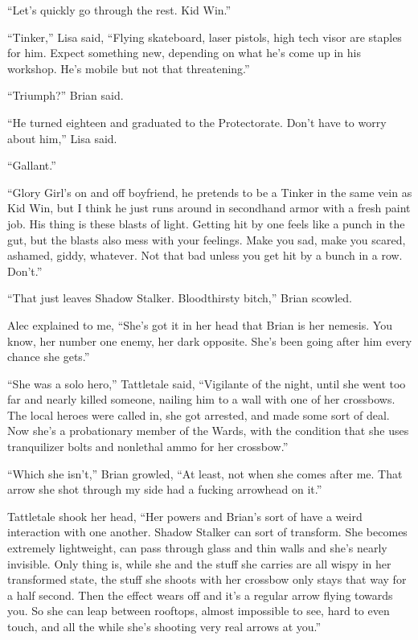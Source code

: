 ``Let's quickly go through the rest.  Kid Win.''



``Tinker,'' Lisa said, ``Flying skateboard, laser pistols, high tech visor are staples for him.  Expect something new, depending on what he's come up in his workshop.  He's mobile but not that threatening.''



``Triumph?'' Brian said.



``He turned eighteen and graduated to the Protectorate.  Don't have to worry about him,'' Lisa said.



``Gallant.''



``Glory Girl's on and off boyfriend, he pretends to be a Tinker in the same vein as Kid Win, but I think he just runs around in secondhand armor with a fresh paint job.  His thing is these blasts of light.  Getting hit by one feels like a punch in the gut, but the blasts also mess with your feelings.  Make you sad, make you scared, ashamed, giddy, whatever.  Not that bad unless you get hit by a bunch in a row.  Don't.''



``That just leaves Shadow Stalker.  Bloodthirsty bitch,'' Brian scowled.



Alec explained to me, ``She's got it in her head that Brian is her nemesis.  You know, her number one enemy, her dark opposite.  She's been going after him every chance she gets.''



``She was a solo hero,'' Tattletale said, ``Vigilante of the night, until she went too far and nearly killed someone, nailing him to a wall with one of her crossbows.  The local heroes were called in, she got arrested, and made some sort of deal.  Now she's a probationary member of the Wards, with the condition that she uses tranquilizer bolts and nonlethal ammo for her crossbow.''



``Which she isn't,'' Brian growled, ``At least, not when she comes after me.  That arrow she shot through my side had a fucking arrowhead on it.''



Tattletale shook her head, ``Her powers and Brian's sort of have a weird interaction with one another.  Shadow Stalker can sort of transform.  She becomes extremely lightweight, can pass through glass and thin walls and she's nearly invisible.  Only thing is, while she and the stuff she carries are all wispy in her transformed state, the stuff she shoots with her crossbow only stays that way for a half second.  Then the effect wears off and it's a regular arrow flying towards you. So she can leap between rooftops, almost impossible to see, hard to even touch, and all the while she's shooting very real arrows at you.''



